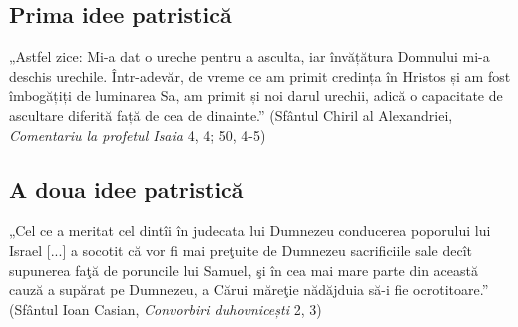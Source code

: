 \subsection{Prima idee patristică}
\begin{displayquote}
    „Astfel zice: Mi-a dat o ureche pentru a asculta, iar învățătura Domnului mi-a deschis urechile. Într-adevăr, de vreme ce am primit credința în Hristos și am fost îmbogățiți de luminarea Sa, am primit și noi darul urechii, adică o capacitate de ascultare diferită față de cea de dinainte.”
    (Sfântul Chiril al Alexandriei, \textit{Comentariu la profetul Isaia} 4, 4; 50, 4-5)
\end{displayquote}


\subsection{A doua idee patristică}
\begin{displayquote}
    „Cel ce a meritat cel dintîi în judecata lui Dumnezeu conducerea poporului lui Israel [...] a socotit că vor fi mai preţuite de Dumnezeu sacrificiile sale decît supunerea faţă de poruncile lui Samuel, şi în cea mai mare parte din această cauză a supărat pe Dumnezeu, a Cărui măreţie nădăjduia să-i fie ocrotitoare.”
    (Sfântul Ioan Casian, \textit{Convorbiri duhovnicești} 2, 3)
\end{displayquote}